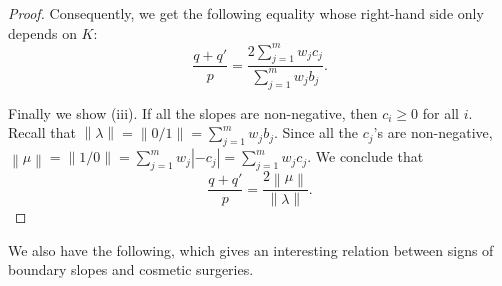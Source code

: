 \documentclass{amsart}
\theoremstyle{remark}
\theoremstyle{definition}
\begin{document}
\begin{proof}
Consequently, we get the following equality whose right-hand side only depends on $K$: 
$$
\frac{ q + q' }{p} = \frac{ 2 \sum_{j=1}^{m} w_j c_j }{\sum_{j=1}^{m} w_j b_j  } .
$$

Finally we show (iii). If all the slopes are non-negative, then $c_{i}\geq 0$ for all $i$. 
Recall that $ \left\| \lambda \right\| = \left\|0/1 \right\| = 
\sum_{j=1}^{m} w_j b_j $. Since all the $c_j$'s are non-negative, 
$ \left\| \mu \right\| = \left\| 1/0 \right\| = \sum_{j=1}^{m} w_j | - c_j | = \sum_{j=1}^{m} w_j c_j $.  
We conclude that 
$$
\frac{ q + q' }{p} = \frac{ 2 \left\| \mu \right\|  }{ \left\| \lambda \right\|  } .
$$
\end{proof}

We also have the following, which gives an interesting relation between signs of boundary slopes and cosmetic surgeries.
\end{document}
